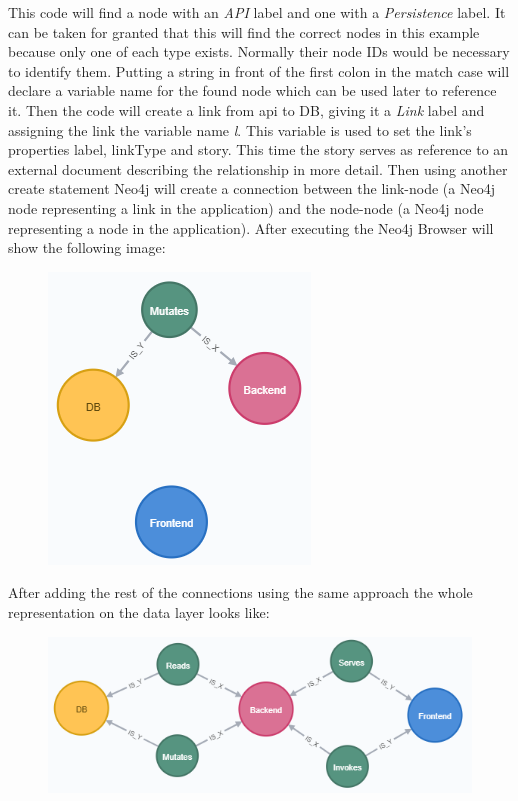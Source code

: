 This code will find a node with an \emph{API} label and one with a \emph{Persistence} label. It can be taken for granted that this will find the correct nodes in this example because only one of each type exists. Normally their node IDs would be necessary to identify them. Putting a string in front of the first colon in the match case will declare a variable name for the found node which can be used later to reference it. Then the code will create a link from api to DB, giving it a \emph{Link} label and assigning the link the variable name \emph{l}. This variable is used to set the link's properties label, linkType and story. This time the story serves as reference to an external document describing the relationship in more detail. Then using another create statement Neo4j will create a connection between the link-node (a Neo4j node representing a link in the application) and the node-node (a Neo4j node representing a node in the application). After executing the Neo4j Browser will show the following image:
\begin{figure}[H]
\centering
\includegraphics[scale=1]{Bilder/BasicGraphNeo2.png}
\label{ex423}
\end{figure}

After adding the rest of the connections using the same approach the whole representation on the data layer looks like:
\begin{figure}[H]
\centering
\includegraphics[scale=1]{Bilder/BasicGraphNeo3.png}
\label{ex424}
\end{figure}

